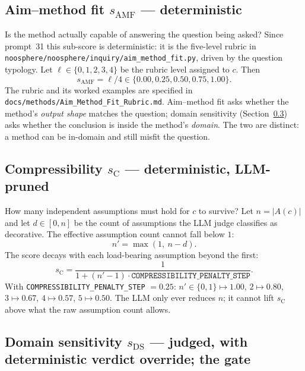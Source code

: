 \documentclass[11pt]{article}
\newcommand{\sAMF}{s_{\mathrm{AMF}}}
\newcommand{\sC}{s_{\mathrm{C}}}
\newcommand{\sDS}{s_{\mathrm{DS}}}
\newcommand{\code}[1]{\texttt{#1}}
\begin{document}
\subsection{Aim--method fit $\sAMF$ --- deterministic}

Is the method actually capable of answering the question being asked? Since
prompt~31 this sub-score is deterministic: it is the five-level rubric in
\code{noosphere/noosphere/inquiry/aim\_method\_fit.py}, driven by the question
typology. Let $\ell \in \{0,1,2,3,4\}$ be the rubric level assigned to $c$.
Then
\begin{equation}
\label{eq:amf}
\sAMF = \ell / 4 \in \{0.00, 0.25, 0.50, 0.75, 1.00\}.
\end{equation}
The rubric and its worked examples are specified in
\code{docs/methods/Aim\_Method\_Fit\_Rubric.md}. Aim--method fit asks whether
the method's \emph{output shape} matches the question; domain sensitivity
(Section~\ref{sec:domain}) asks whether the conclusion is inside the method's
\emph{domain}. The two are distinct: a method can be in-domain and still
misfit the question.

\subsection{Compressibility $\sC$ --- deterministic, LLM-pruned}

How many independent assumptions must hold for $c$ to survive? Let $n = |A(c)|$
and let $d \in [0,n]$ be the count of assumptions the LLM judge classifies as
decorative. The effective assumption count cannot fall below $1$:
\begin{equation}
\label{eq:comp-eff}
n' = \max(1,\ n - d).
\end{equation}
The score decays with each load-bearing assumption beyond the first:
\begin{equation}
\label{eq:comp}
\sC = \frac{1}{1 + (n' - 1)\cdot \texttt{COMPRESSIBILITY\_PENALTY\_STEP}}.
\end{equation}
With \texttt{COMPRESSIBILITY\_PENALTY\_STEP} $= 0.25$: $n' \in \{0,1\}
\mapsto 1.00$, $2 \mapsto 0.80$, $3 \mapsto 0.67$, $4 \mapsto 0.57$,
$5 \mapsto 0.50$. The LLM only ever reduces $n$; it cannot lift $\sC$ above
what the raw assumption count allows.

\subsection{Domain sensitivity $\sDS$ --- judged, with deterministic verdict override; the gate}
\label{sec:domain}
\end{document}
